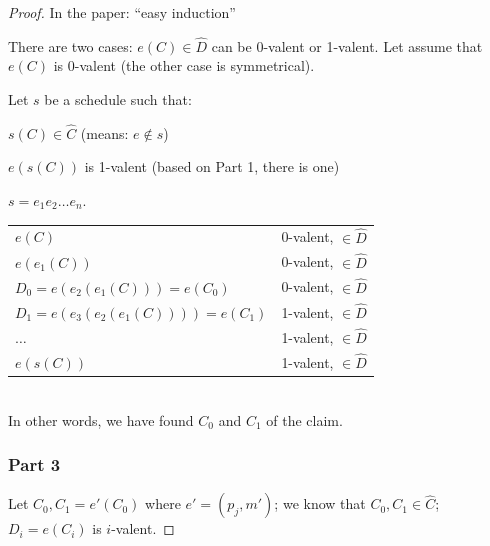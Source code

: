 \documentclass[12pt]{article}
\begin{document}
\begin{proof}
In the paper: ``easy induction''

There are two cases: $e(C) \in \hat{D}$ can be 0-valent or 1-valent.
Let assume that $e(C)$ is 0-valent (the other case is symmetrical).

Let $s$ be a schedule such that:
\BI
\item $s(C) \in \hat{C}$ (means: $e \not\in s$)
\item $e(s(C))$ is 1-valent (based on Part 1, there is one)
\item $s=e_1 e_2 \ldots e_n$.
\EI

\begin{tabular}{ll}
$e(C)$					& 0-valent, $\in \hat{D}$ \\
$e(e_1(C))$				& 0-valent, $\in \hat{D}$ \\
$D_0=e(e_2(e_1(C))) = e(C_0)$		& 0-valent, $\in \hat{D}$ \\
$D_1=e(e_3(e_2(e_1(C)))) = e(C_1)$	& 1-valent, $\in \hat{D}$ \\
$\ldots$				& 1-valent, $\in \hat{D}$ \\
$e(s(C))$				& 1-valent, $\in \hat{D}$ \\
\end{tabular}
~\\

In other words, we have found $C_0$ and $C_1$ of the claim.

\newpage
\subsubsection*{Part 3}

Let $C_0, C_1=e'(C_0)$ where $e'=(p_j,m')$; we know that
$C_0, C_1 \in \hat{C}$; $D_i = e(C_i)$ is $i$-valent.


\end{proof}
\end{document}
